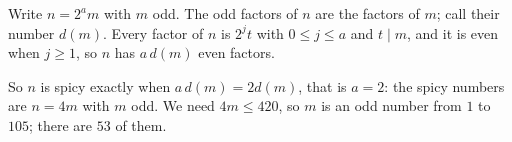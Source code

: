 Write $n=2^a m$ with $m$ odd. The odd factors of $n$ are the factors of $m$; call their number $d(m)$. Every factor of $n$ is $2^j t$ with $0\le j\le a$ and $t\mid m$, and it is even when $j\ge1$, so $n$ has $a\,d(m)$ even factors.

So $n$ is spicy exactly when $a\,d(m)=2d(m)$, that is $a=2$: the spicy numbers are $n=4m$ with $m$ odd. We need $4m\le420$, so $m$ is an odd number from $1$ to $105$; there are $\boxed{53}$ of them.
